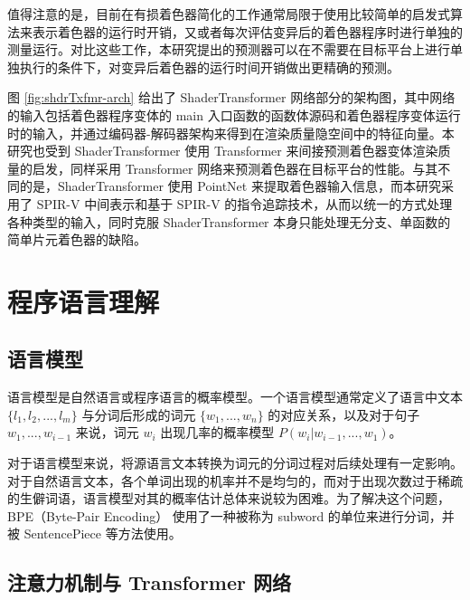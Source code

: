 值得注意的是，目前在有损着色器简化的工作通常局限于使用比较简单的启发式算法来表示着色器的运行时开销\cite{10.1145/2816795.2818104, 10.1111/cgf.13482, 10.1145/3528233.3530722}，又或者每次评估变异后的着色器程序时进行单独的测量运行\cite{10.1145/2661229.2661276}。对比这些工作，本研究提出的预测器可以在不需要在目标平台上进行单独执行的条件下，对变异后着色器的运行时间开销做出更精确的预测。

图 \ref{fig:shdrTxfmr-arch} 给出了 ShaderTransformer 网络部分的架构图，其中网络的输入包括着色器程序变体的 main 入口函数的函数体源码和着色器程序变体运行时的输入，并通过编码器-解码器架构来得到在渲染质量隐空间中的特征向量。本研究也受到 ShaderTransformer 使用 Transformer 来间接预测着色器变体渲染质量的启发，同样采用 Transformer 网络来预测着色器在目标平台的性能。与其不同的是，ShaderTransformer 使用 PointNet\cite{8099499} 来提取着色器输入信息，而本研究采用了 SPIR-V 中间表示和基于 SPIR-V 的指令追踪技术，从而以统一的方式处理各种类型的输入，同时克服 ShaderTransformer 本身只能处理无分支、单函数的简单片元着色器的缺陷。

\section{程序语言理解}

\label{sec:pl_understanding}

\subsection{语言模型}

\label{sec:language_model}

语言模型是自然语言或程序语言的概率模型。一个语言模型通常定义了语言中文本 $\{l_1, l_2, ..., l_m\}$ 与分词后形成的词元 $\{w_1, ..., w_n\}$ 的对应关系，以及对于句子 $ w_1, ..., w_{i-1} $ 来说，词元 $ w_i$ 出现几率的概率模型 $P(w_i|w_{i-1}, ..., w_{1})
$。


对于语言模型来说，将源语言文本转换为词元的分词过程对后续处理有一定影响。对于自然语言文本，各个单词出现的机率并不是均匀的，而对于出现次数过于稀疏的生僻词语，语言模型对其的概率估计总体来说较为困难。为了解决这个问题，BPE（Byte-Pair Encoding）\cite{sennrich-etal-2016-neural} 使用了一种被称为 subword 的单位来进行分词，并被 SentencePiece \cite{kudo-richardson-2018-sentencepiece} 等方法使用。

\subsection{注意力机制与 Transformer 网络}

